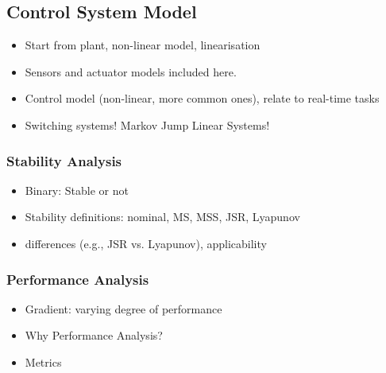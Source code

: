 {\subsection*{Control System Model}%
%
\begin{itemize}
    \item Start from plant, non-linear model, linearisation
    \item Sensors and actuator models included here.
    \item Control model (non-linear, more common ones), relate to real-time
        tasks
    \item Switching systems! Markov Jump Linear Systems!
\end{itemize}


\subsubsection*{Stability Analysis}%
%
\begin{itemize}
    \item Binary: Stable or not
    \item Stability definitions: nominal, MS, MSS, JSR, Lyapunov
    \item differences (e.g., JSR vs. Lyapunov), applicability
\end{itemize}


\subsubsection*{Performance Analysis}%
%
\begin{itemize}
    \item Gradient: varying degree of performance
    \item Why Performance Analysis?
    \item Metrics
\end{itemize}

}%



